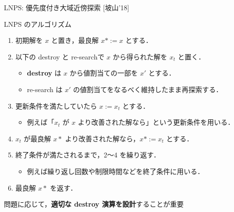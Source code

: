 \documentclass[11pt,dvipdfmx,handout]{beamer}
\begin{document}
\begin{frame}{LNPS: 優先度付き大域近傍探索 [坡山'18]}
  \begin{block}{\small LNPS のアルゴリズム}
    \begin{enumerate}
      \compress
      \item 初期解を $x$ と置き，最良解 $x* := x$ とする．
      \item 以下の destroy と re-searchで $x$ から得られた解を $x_t$ と置く．
      \begin{itemize}
        \compress
        \item \alert{\bf destroy} は $x$ から値割当ての一部を $x'$ とする．
        \item re-search は $x'$ の値割当てをなるべく維持したまま再探索する．
      \end{itemize}
      \item 更新条件を満たしていたら $x := x_t$ とする．
      \begin{itemize}
        \item 例えば「$x_t$ が $x$ より改善された解なら」という更新条件を用いる．
      \end{itemize}
      \item $x_t$ が最良解 $x*$ より改善された解なら，$x* := x_t$ とする．
      \item 終了条件が満たされるまで，2〜4 を繰り返す．
      \begin{itemize}
        \item 例えば繰り返し回数や制限時間などを終了条件に用いる．
      \end{itemize}
      \item 最良解 $x*$ を返す．
    \end{enumerate}
  \end{block}

  \begin{alertblock}{}\centering
    問題に応じて，\alert{\bf 適切な destroy 演算を設計}することが重要
  \end{alertblock}
\end{frame}
\end{document}
